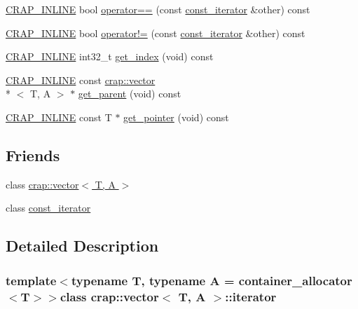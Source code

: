 \begin{DoxyCompactItemize}
\item 
\hyperlink{config__x86_8h_a5a40526b8d842e7ff731509998bb0f1c}{C\+R\+A\+P\+\_\+\+I\+N\+L\+I\+N\+E} bool \hyperlink{classcrap_1_1vector_1_1iterator_a098fc266035b449ac85ebc1a7f82a028}{operator==} (const \hyperlink{classcrap_1_1vector_1_1const__iterator}{const\+\_\+iterator} \&other) const 
\item 
\hyperlink{config__x86_8h_a5a40526b8d842e7ff731509998bb0f1c}{C\+R\+A\+P\+\_\+\+I\+N\+L\+I\+N\+E} bool \hyperlink{classcrap_1_1vector_1_1iterator_aa404161e16e93a4fb330b7ef4cd10ca0}{operator!=} (const \hyperlink{classcrap_1_1vector_1_1const__iterator}{const\+\_\+iterator} \&other) const 
\item 
\hyperlink{config__x86_8h_a5a40526b8d842e7ff731509998bb0f1c}{C\+R\+A\+P\+\_\+\+I\+N\+L\+I\+N\+E} int32\+\_\+t \hyperlink{classcrap_1_1vector_1_1iterator_a0c8b9f2d14d886244c3cbbfa99e93e49}{get\+\_\+index} (void) const 
\item 
\hyperlink{config__x86_8h_a5a40526b8d842e7ff731509998bb0f1c}{C\+R\+A\+P\+\_\+\+I\+N\+L\+I\+N\+E} const \hyperlink{classcrap_1_1vector}{crap\+::vector}\\*
$<$ T, A $>$ $\ast$ \hyperlink{classcrap_1_1vector_1_1iterator_afc467fa8d4d420bbdd43eb9866ee92b9}{get\+\_\+parent} (void) const 
\item 
\hyperlink{config__x86_8h_a5a40526b8d842e7ff731509998bb0f1c}{C\+R\+A\+P\+\_\+\+I\+N\+L\+I\+N\+E} const T $\ast$ \hyperlink{classcrap_1_1vector_1_1iterator_ad5698ba2b0bf4c17b14e7cb7a799d320}{get\+\_\+pointer} (void) const 
\end{DoxyCompactItemize}
\subsection*{Friends}
\begin{DoxyCompactItemize}
\item 
class \hyperlink{classcrap_1_1vector_1_1iterator_ad6b7070de08891c8bdaba9bce10c2220}{crap\+::vector$<$ T, A $>$}
\item 
class \hyperlink{classcrap_1_1vector_1_1iterator_ac220ce1c155db1ac44146c12d178056f}{const\+\_\+iterator}
\end{DoxyCompactItemize}


\subsection{Detailed Description}
\subsubsection*{template$<$typename T, typename A = container\+\_\+allocator$<$\+T$>$$>$class crap\+::vector$<$ T, A $>$\+::iterator}



